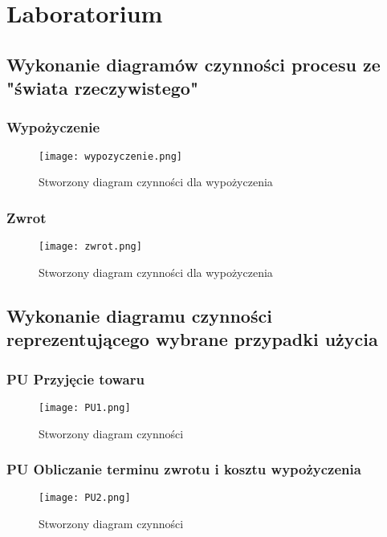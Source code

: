 \documentclass{article}
\begin{document}
	\section{Laboratorium}
	\subsection{Wykonanie diagramów czynności procesu ze "świata rzeczywistego"}
	\subsubsection{Wypożyczenie}
	\begin{figure}[!ht]
	\centering
	\texttt{[image: wypozyczenie.png]}
	\caption{Stworzony diagram czynności dla wypożyczenia}
	\label{fig:obrazek 1}
	\end{figure}
	\subsubsection{Zwrot}
\begin{figure}[!ht]
	\centering
	\texttt{[image: zwrot.png]}
	\caption{Stworzony diagram czynności dla wypożyczenia}
	\label{fig:obrazek 2}
\end{figure}
	\newpage
	\subsection{Wykonanie diagramu czynności reprezentującego wybrane przypadki użycia}
\subsubsection{PU Przyjęcie towaru}
\begin{figure}[!ht]
	\centering
	\texttt{[image: PU1.png]}
	\caption{Stworzony diagram czynności}
	\label{fig:obrazek 3}
\end{figure}
\newpage
\subsubsection{PU Obliczanie terminu zwrotu i kosztu wypożyczenia}	
\begin{figure}[!ht]
	\centering
	\texttt{[image: PU2.png]}
	\caption{Stworzony diagram czynności}
	\label{fig:obrazek 4}
\end{figure}	
\end{document}
